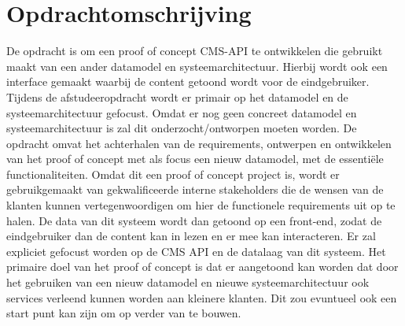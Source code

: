 \section{Opdrachtomschrijving}
De opdracht is om een proof of concept \gls{CMS}-API te ontwikkelen die gebruikt maakt van een ander datamodel en systeemarchitectuur.
Hierbij wordt ook een interface gemaakt waarbij de content getoond wordt voor de eindgebruiker.
Tijdens de afstudeeropdracht wordt er primair op het datamodel en de systeemarchitectuur gefocust.
Omdat er nog geen concreet datamodel en systeemarchitectuur is zal dit onderzocht/ontworpen moeten worden.
\whitespace
De opdracht omvat het achterhalen van de requirements, ontwerpen en ontwikkelen van het proof of
concept met als focus een nieuw datamodel, met de essentiële functionaliteiten. Omdat dit een proof of
concept project is, wordt er gebruikgemaakt van gekwalificeerde interne stakeholders die de wensen van
de klanten kunnen vertegenwoordigen om hier de functionele requirements uit op te halen.
\whitespace
De data van dit systeem wordt dan getoond op een front-end, zodat de eindgebruiker dan de content kan in
lezen en er mee kan interacteren. Er zal expliciet gefocust worden op de \gls{CMS} API en de datalaag van dit
systeem.
\whitespace
Het primaire doel van het proof of concept is dat er aangetoond kan worden dat door het gebruiken van een nieuw
datamodel en nieuwe systeemarchitectuur ook services verleend kunnen worden aan kleinere klanten.
Dit zou evuntueel ook een start punt kan zijn om op verder van te bouwen.
